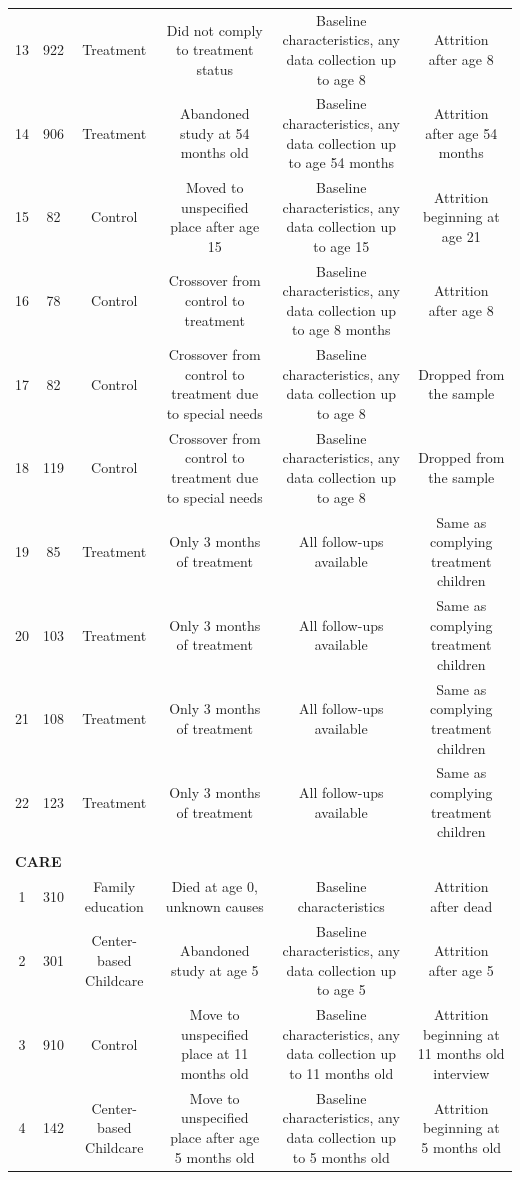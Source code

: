 \begin{table}
\begin{threeparttable}
\begin{tabular}{cccccc}
13 & 922 & Treatment  & Did not comply to treatment status  & Baseline characteristics, any data collection up to age 8 & Attrition after age 8 \\
14 & 906 & Treatment  & Abandoned study at 54 months old  & Baseline characteristics, any data collection up to age 54 months & Attrition after age 54 months \\
15 & 82 & Control       & Moved to unspecified place after age 15 &   Baseline characteristics, any data collection up to age 15 & Attrition beginning at age 21 \\
16 &  78  & Control       & Crossover from control to treatment  & Baseline characteristics, any data collection up to age 8 months & Attrition after age 8 \\
17 &  82 & Control       & Crossover from control to treatment due to special needs & Baseline characteristics, any data collection up to age 8 & Dropped from the sample \\ 
18 & 119 & Control       & Crossover from control to treatment due to special needs & Baseline characteristics, any data collection up to age 8 & Dropped from the sample \\ 
19 & 85 & Treatment         & Only 3 months of treatment  & All follow-ups available   & Same as complying treatment children  \\ 
20 & 103 & Treatment         & Only 3 months of treatment  & All follow-ups available   & Same as complying treatment children  \\ 
21 & 108 & Treatment         & Only 3 months of treatment  & All follow-ups available   & Same as complying treatment children  \\ 
22 & 123 & Treatment         & Only 3 months of treatment  & All follow-ups available   & Same as complying treatment children  \\ \\ \hline
\multicolumn{6}{l}{\textbf{CARE}} \\
1 & 310 & Family education & Died at age 0, unknown causes & Baseline characteristics & Attrition after dead \\
2 & 301 & Center-based Childcare  & Abandoned study at age 5  & Baseline characteristics, any data collection up to age 5 & Attrition after age 5 \\
3 & 910 & Control & Move to unspecified place at 11 months old & Baseline characteristics, any data collection up to 11 months old & Attrition beginning at 11 months old interview \\
4 & 142 & Center-based Childcare & Move to unspecified place after age 5 months old & Baseline characteristics, any data collection up to 5 months old & Attrition beginning at 5 months old \\

\end{tabular}
\end{threeparttable}
\end{table}
